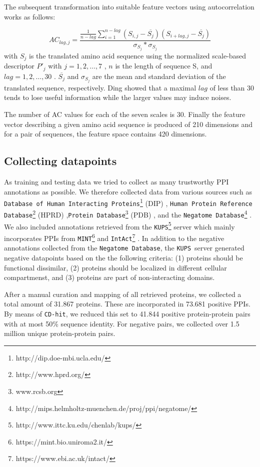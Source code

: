 \documentclass[preprint,3p,times,twocolumn]{elsarticle}
\newcommand{\nega}{\texttt{Negatome Database}}
\newcommand{\kups}{\texttt{KUPS}}
\begin{document}
The subsequent transformation into suitable feature vectors using autocorrelation works as follows:

\begin{equation}
AC_{lag, j} = \frac {\frac{1}{n-lag} \sum^{n-lag}_{i=1} ( S_{i,j} - \overline{S_j}) (S_{i+lag,j} - \overline{S_j})} { \sigma_{S_j} * \sigma_{S_j} }
\end{equation}
with $S_j$ is the translated amino acid sequence using the normalized scale-based descriptor $P'_j$ with $j = 1, 2, \dots, 7$ , $n$ is the length of sequence S, and $lag = 1, 2, \dots, 30$ . $\overline{S_j}$ and  $\sigma_{S_j}$ are the mean and standard deviation of the translated sequence, respectively.
Ding \cite{Ding:2016} showed that a maximal $lag$ of less than 30 tends to lose useful information while the larger values may induce noises.

The number of AC values for each of the seven scales is 30. Finally the feature vector describing a given amino acid sequence is produced of 210 dimensions and for a pair of sequences, the feature space contains 420 dimensions.

 
\subsection{Collecting datapoints}
As training and testing data we tried to collect as many trustworthy PPI annotations as possible. We therefore collected data from various sources such as \texttt{Database of Human Interacting Proteins}\footnote{http://dip.doe-mbi.ucla.edu/} (DIP) \cite{Salwinski:2004}, \texttt{Human Protein Reference Database}\footnote{http://www.hprd.org/} (HPRD) \cite{Keshava_Prasad:2009},\texttt{Protein Database}\footnote{www.rcsb.org} (PDB) \cite{Berman:2000}, and the \nega\footnote{http://mips.helmholtz-muenchen.de/proj/ppi/negatome/} \cite{Blohm:2014}. We also included annotations retrieved from the \kups \footnote{http://www.ittc.ku.edu/chenlab/kups/}   server \cite{Chen:2011} which mainly incorporates PPIs from \texttt{MINT}\footnote{https://mint.bio.uniroma2.it/} \cite{Licata:2012} and \texttt{IntAct}\footnote{https://www.ebi.ac.uk/intact/} \cite{Orchard:2014}. In addition to the negative annotations collected from the \nega, the \kups\ server generated negative datapoints based on the the following criteria: (1) proteins should be functional dissimilar, (2) proteins should be localized in different cellular compartmenst, and (3) proteins are part of non-interacting domains.

After a manual curation and mapping of all retrieved proteins, we collected a total amount of 31.867 proteins. These are incorporated in 73.681 positive PPIs. By means of \texttt{CD-hit}, we reduced this set to 41.844 positive protein-protein pairs with at most 50\% sequence identity. For negative pairs, we collected over 1.5 million unique protein-protein pairs.
\end{document}
